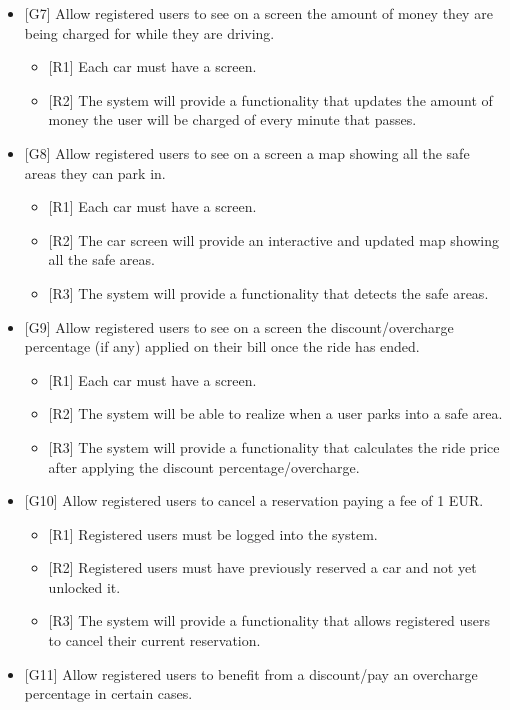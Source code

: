\begin{itemize}
	\item {[G7]} Allow registered users to see on a screen the amount of money they are being charged for while they are driving. 
	\begin{itemize}
		\item {[R1]} Each car must have a screen. 
		\item {[R2]} The system will provide a functionality that updates the amount of money the user will be charged of every minute that passes. 
	\end{itemize}
	\item {[G8]} Allow registered users to see on a screen a map showing all the safe areas they can park in. 
	\begin{itemize}
		\item {[R1]} Each car must have a screen.
		\item {[R2]} The car screen will provide an interactive and updated map showing all the safe areas.
		\item {[R3]} The system will provide a functionality that detects the safe areas.
	\end{itemize}
	\item {[G9]} Allow registered users to see on a screen the discount/overcharge percentage (if any) applied on their bill once the ride has ended.
	\begin{itemize}
		\item {[R1]} Each car must have a screen.
		\item {[R2]} The system will be able to realize when a user parks into a safe area.
		\item {[R3]} The system will provide a functionality that calculates the ride price after applying the discount percentage/overcharge.
	\end{itemize}
	\item {[G10]} Allow registered users to cancel a reservation paying a fee of 1 EUR.
	\begin{itemize}
		\item {[R1]} Registered users must be logged into the system.
		\item {[R2]} Registered users must have previously reserved a car and not yet unlocked it.
		\item {[R3]} The system will provide a functionality that allows registered users to cancel their current reservation.
	\end{itemize}
	\item {[G11]} Allow registered users to benefit from a discount/pay an overcharge percentage in certain cases.

\end{itemize}
